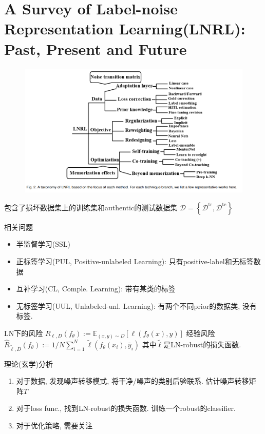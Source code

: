 \documentclass{article}
\begin{document}
\section{A Survey of Label-noise Representation Learning(LNRL): Past, Present and Future}

\begin{figure}[htbp]
    \centering
    \includegraphics[width=\textwidth]{lnrl-taxo.png}
\end{figure}

包含了损坏数据集上的训练集和authentic的测试数据集
$\mathcal{D}=\left\{\mathcal{D}^{\mathrm{tr}}, \mathcal{D}^{\mathrm{te}}\right\}$



相关问题
\begin{itemize}
    \item 半监督学习(SSL)
    \item 正标签学习(PUL, Positive-unlabeled Learning): 只有positive-label和无标签数据
    \item 互补学习(CL, Comple. Learning): 带有某类的标签
    \item 无标签学习(UUL, Unlabeled-unl. Learning): 有两个不同prior的数据类, 没有标签.
\end{itemize}

LN下的风险
$R_{\ell, D}\left(f_{\theta}\right):=\mathbb{E}_{(x, y) \sim D}\left[\ell\left(f_{\theta}(x), y\right)\right]$
经验风险
$\widehat{R}_{\tilde{\ell}, \bar{D}}\left(f_{\theta}\right):=1 / N \sum_{i=1}^{N} \tilde{\ell}\left(f_{\theta}\left(x_{i}\right), \bar{y}_{i}\right)$
其中$\tilde{\ell}$是LN-robust的损失函数.

理论(玄学)分析
\begin{enumerate}
    \item 对于数据, 发现噪声转移模式, 将干净/噪声的类别后验联系. 估计噪声转移矩阵$T$
    \item 对于loss func., 找到LN-robust的损失函数. 训练一个robust的classifier.
    \item 对于优化策略, 需要关注
\end{enumerate}
\end{document}
